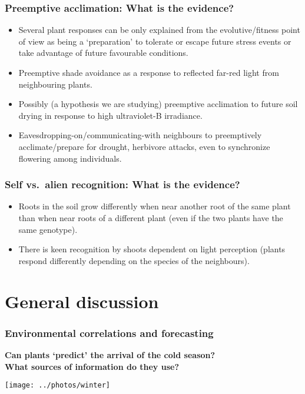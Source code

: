 \documentclass[10pt]{beamer}
\newcommand\webglyphs[1]{{\webglyphsfont\symbol{#1}}}
\newcommand\Discussion{\colorbox{white}{\textcolor{black}{\webglyphs{"F134}}}\xspace}
\begin{document}
\begin{frame}
  \frametitle{Preemptive acclimation: What is the evidence?}
  \begin{itemize}
    \item Several plant responses can be only explained from the evolutive/fitness
    point of view as being a `preparation' to tolerate or escape future stress events or
    take advantage of future favourable conditions.
    \item Preemptive shade avoidance as a response to reflected far-red light from neighbouring
    plants.
    \item Possibly (a hypothesis we are studying) preemptive acclimation to future soil
    drying in response to high ultraviolet-B irradiance.
    \item Eavesdropping-on/communicating-with neighbours to preemptively acclimate/prepare
    for drought, herbivore attacks, even to synchronize flowering among individuals.
  \end{itemize}
\end{frame}

\begin{frame}
  \frametitle{Self vs.\ alien recognition: What is the evidence?}
  \begin{itemize}
    \item Roots in the soil grow differently when near another root of the same plant than
    when near roots of a different plant (even if the two plants have the same genotype).
    \item There is keen recognition by shoots dependent on light perception (plants respond
    differently depending on the species of the neighbours).
  \end{itemize}
\end{frame}

\section{General discussion}

\begin{frame}
\frametitle{Environmental correlations and forecasting \Discussion}

\textbf{Can plants `predict' the arrival of the cold season?\\
 What sources of information do they use?}

    \centering
    \texttt{[image: ../photos/winter]}
\end{frame}
\end{document}
